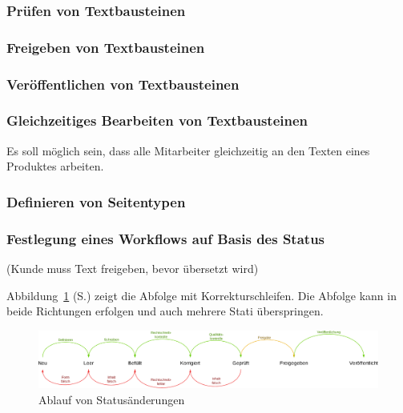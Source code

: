 \subsubsection{Prüfen von Textbausteinen}

\subsubsection{Freigeben von Textbausteinen}

\subsubsection{Veröffentlichen von Textbausteinen}

\subsubsection{Gleichzeitiges Bearbeiten von Textbausteinen}

Es soll möglich sein, dass alle  Mitarbeiter gleichzeitig an den Texten eines Produktes arbeiten.

\subsubsection{Definieren von Seitentypen}

\subsubsection{Festlegung eines Workflows auf Basis des Status}

(Kunde muss Text freigeben, bevor übersetzt wird)

Abbildung~\ref{chart:statimitworkflow} (S.\pageref{chart:statimitworkflow}) zeigt die Abfolge mit Korrekturschleifen. Die Abfolge kann in beide Richtungen erfolgen und auch mehrere Stati überspringen.

\begin{figure}[htb]
\begin{center}
\includegraphics[width=\textwidth]{media/stati-mit-workflow.pdf}
\end{center}
\caption{Ablauf von Statusänderungen}
\label{chart:statimitworkflow}
\end{figure}

